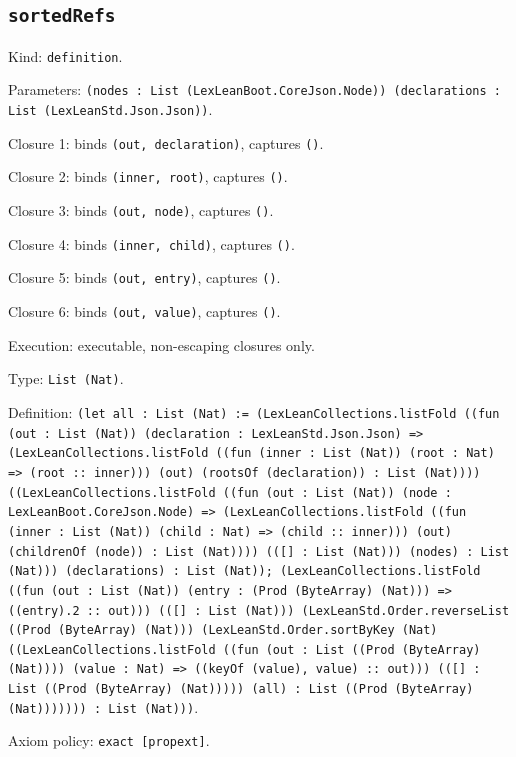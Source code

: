 \documentclass[11pt]{article}
\begin{document}
\subsection*{\texttt{sortedRefs}}
\noindent Kind: \texttt{definition}.\par
\noindent Parameters: \texttt{(nodes : List (LexLeanBoot.CoreJson.Node)) (declarations : List (LexLeanStd.Json.Json))}.\par
\noindent Closure 1: binds \texttt{(out, declaration)}, captures \texttt{()}.\par
\noindent Closure 2: binds \texttt{(inner, root)}, captures \texttt{()}.\par
\noindent Closure 3: binds \texttt{(out, node)}, captures \texttt{()}.\par
\noindent Closure 4: binds \texttt{(inner, child)}, captures \texttt{()}.\par
\noindent Closure 5: binds \texttt{(out, entry)}, captures \texttt{()}.\par
\noindent Closure 6: binds \texttt{(out, value)}, captures \texttt{()}.\par
\noindent Execution: executable, non-escaping closures only.\par
\noindent Type: \texttt{List (Nat)}.\par
\noindent Definition: \texttt{(let all : List (Nat) := (LexLeanCollections.listFold ((fun (out : List (Nat)) (declaration : LexLeanStd.Json.Json) => (LexLeanCollections.listFold ((fun (inner : List (Nat)) (root : Nat) => (root :: inner))) (out) (rootsOf (declaration)) : List (Nat)))) ((LexLeanCollections.listFold ((fun (out : List (Nat)) (node : LexLeanBoot.CoreJson.Node) => (LexLeanCollections.listFold ((fun (inner : List (Nat)) (child : Nat) => (child :: inner))) (out) (childrenOf (node)) : List (Nat)))) (([] : List (Nat))) (nodes) : List (Nat))) (declarations) : List (Nat)); (LexLeanCollections.listFold ((fun (out : List (Nat)) (entry : (Prod (ByteArray) (Nat))) => ((entry).2 :: out))) (([] : List (Nat))) (LexLeanStd.Order.reverseList ((Prod (ByteArray) (Nat))) (LexLeanStd.Order.sortByKey (Nat) ((LexLeanCollections.listFold ((fun (out : List ((Prod (ByteArray) (Nat)))) (value : Nat) => ((keyOf (value), value) :: out))) (([] : List ((Prod (ByteArray) (Nat))))) (all) : List ((Prod (ByteArray) (Nat))))))) : List (Nat)))}.\par
\noindent Axiom policy: \texttt{exact [propext]}.\par
\end{document}
